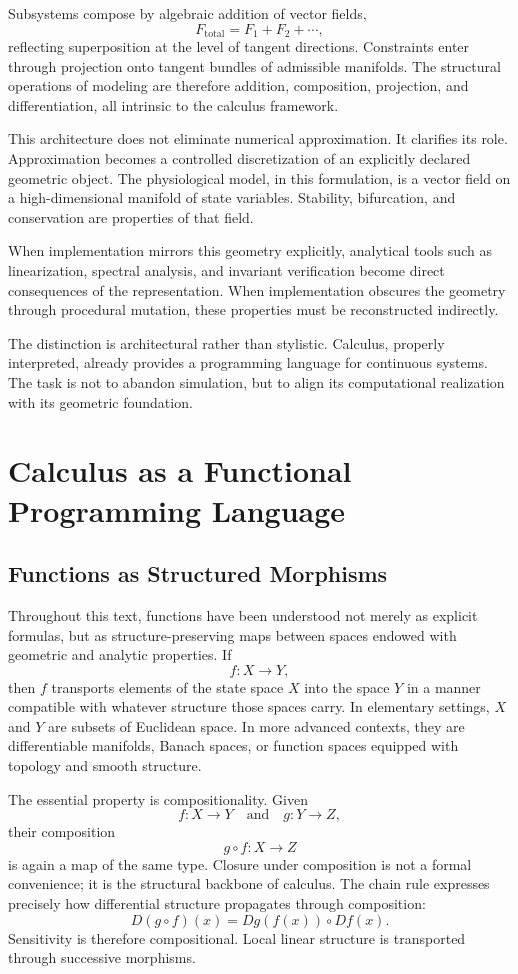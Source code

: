 \documentclass[12pt]{book}
\begin{document}
Subsystems compose by algebraic addition of vector fields,
\[
F_{\text{total}} = F_1 + F_2 + \cdots,
\]
reflecting superposition at the level of tangent directions.
Constraints enter through projection onto tangent bundles of
admissible manifolds. The structural operations of modeling are
therefore addition, composition, projection, and differentiation,
all intrinsic to the calculus framework.

This architecture does not eliminate numerical approximation.
It clarifies its role. Approximation becomes a controlled discretization
of an explicitly declared geometric object. The physiological model,
in this formulation, is a vector field on a high-dimensional manifold
of state variables. Stability, bifurcation, and conservation are
properties of that field.

When implementation mirrors this geometry explicitly, analytical tools
such as linearization, spectral analysis, and invariant verification
become direct consequences of the representation. When implementation
obscures the geometry through procedural mutation, these properties
must be reconstructed indirectly.

The distinction is architectural rather than stylistic. Calculus,
properly interpreted, already provides a programming language for
continuous systems. The task is not to abandon simulation, but to align
its computational realization with its geometric foundation.

\chapter{Calculus as a Functional Programming Language}

\section{Functions as Structured Morphisms}

Throughout this text, functions have been understood not merely as
explicit formulas, but as structure-preserving maps between spaces
endowed with geometric and analytic properties. If
\[
f : X \to Y,
\]
then $f$ transports elements of the state space $X$ into the space $Y$
in a manner compatible with whatever structure those spaces carry.
In elementary settings, $X$ and $Y$ are subsets of Euclidean space.
In more advanced contexts, they are differentiable manifolds,
Banach spaces, or function spaces equipped with topology and smooth
structure.

The essential property is compositionality. Given
\[
f : X \to Y
\quad \text{and} \quad
g : Y \to Z,
\]
their composition
\[
g \circ f : X \to Z
\]
is again a map of the same type. Closure under composition is not a
formal convenience; it is the structural backbone of calculus. The
chain rule expresses precisely how differential structure propagates
through composition:
\[
D(g \circ f)(x) = Dg(f(x)) \circ Df(x).
\]
Sensitivity is therefore compositional. Local linear structure is
transported through successive morphisms.
\end{document}
